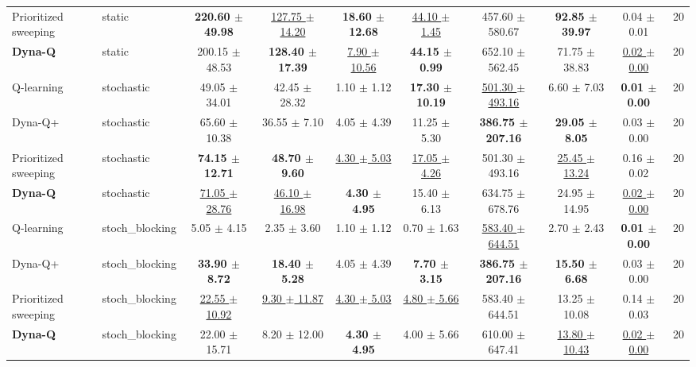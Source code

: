 \begin{tabular}{llcccccccc}
Prioritized sweeping & static & \textbf{220.60 $\pm$ 49.98} & \underline{127.75 $\pm$ 14.20} & \textbf{18.60 $\pm$ 12.68} & \underline{44.10 $\pm$ 1.45} & 457.60 $\pm$ 580.67 & \textbf{92.85 $\pm$ 39.97} & 0.04 $\pm$ 0.01 & 20 \\
\textbf{Dyna-Q} & static & 200.15 $\pm$ 48.53 & \textbf{128.40 $\pm$ 17.39} & \underline{7.90 $\pm$ 10.56} & \textbf{44.15 $\pm$ 0.99} & 652.10 $\pm$ 562.45 & 71.75 $\pm$ 38.83 & \underline{0.02 $\pm$ 0.00} & 20 \\
\midrule
Q-learning & stochastic & 49.05 $\pm$ 34.01 & 42.45 $\pm$ 28.32 & 1.10 $\pm$ 1.12 & \textbf{17.30 $\pm$ 10.19} & \underline{501.30 $\pm$ 493.16} & 6.60 $\pm$ 7.03 & \textbf{0.01 $\pm$ 0.00} & 20 \\
Dyna-Q+ & stochastic & 65.60 $\pm$ 10.38 & 36.55 $\pm$ 7.10 & 4.05 $\pm$ 4.39 & 11.25 $\pm$ 5.30 & \textbf{386.75 $\pm$ 207.16} & \textbf{29.05 $\pm$ 8.05} & 0.03 $\pm$ 0.00 & 20 \\
Prioritized sweeping & stochastic & \textbf{74.15 $\pm$ 12.71} & \textbf{48.70 $\pm$ 9.60} & \underline{4.30 $\pm$ 5.03} & \underline{17.05 $\pm$ 4.26} & 501.30 $\pm$ 493.16 & \underline{25.45 $\pm$ 13.24} & 0.16 $\pm$ 0.02 & 20 \\
\textbf{Dyna-Q} & stochastic & \underline{71.05 $\pm$ 28.76} & \underline{46.10 $\pm$ 16.98} & \textbf{4.30 $\pm$ 4.95} & 15.40 $\pm$ 6.13 & 634.75 $\pm$ 678.76 & 24.95 $\pm$ 14.95 & \underline{0.02 $\pm$ 0.00} & 20 \\
\midrule
Q-learning & stoch\_blocking & 5.05 $\pm$ 4.15 & 2.35 $\pm$ 3.60 & 1.10 $\pm$ 1.12 & 0.70 $\pm$ 1.63 & \underline{583.40 $\pm$ 644.51} & 2.70 $\pm$ 2.43 & \textbf{0.01 $\pm$ 0.00} & 20 \\
Dyna-Q+ & stoch\_blocking & \textbf{33.90 $\pm$ 8.72} & \textbf{18.40 $\pm$ 5.28} & 4.05 $\pm$ 4.39 & \textbf{7.70 $\pm$ 3.15} & \textbf{386.75 $\pm$ 207.16} & \textbf{15.50 $\pm$ 6.68} & 0.03 $\pm$ 0.00 & 20 \\
Prioritized sweeping & stoch\_blocking & \underline{22.55 $\pm$ 10.92} & \underline{9.30 $\pm$ 11.87} & \underline{4.30 $\pm$ 5.03} & \underline{4.80 $\pm$ 5.66} & 583.40 $\pm$ 644.51 & 13.25 $\pm$ 10.08 & 0.14 $\pm$ 0.03 & 20 \\
\textbf{Dyna-Q} & stoch\_blocking & 22.00 $\pm$ 15.71 & 8.20 $\pm$ 12.00 & \textbf{4.30 $\pm$ 4.95} & 4.00 $\pm$ 5.66 & 610.00 $\pm$ 647.41 & \underline{13.80 $\pm$ 10.43} & \underline{0.02 $\pm$ 0.00} & 20 \\
\bottomrule
\end{tabular}
